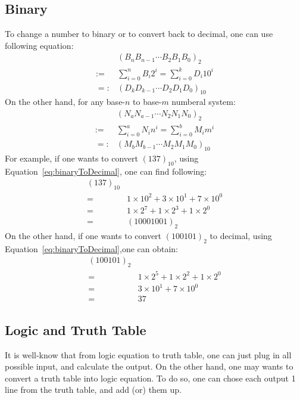 \documentclass[aps,prl,reprint]{revtex4-1}
\begin{document}
	\subsection{Binary}
		To change a number to binary or to convert back to decimal, one can use following equation:
        \begin{align}
            &(B_n B_{n-1} \cdots B_2 B_1 B_0)_2 \\ \nonumber
            :=& \sum_{i = 0}^n B_i 2^i = \sum_{i = 0}^k D_i 10^i \\ \nonumber
            =:& (D_k D_{k-1} \cdots D_2D_1D_0)_{10} \label{eq:binaryToDecimal}
        \end{align}
        On the other hand, for any base-$n$ to base-$m$ numberal system:
        \begin{align}
            &(N_a N_{a-1} \cdots N_2 N_1 N_0)_2 \\ \nonumber
            :=& \sum_{i = 0}^a N_i n^i = \sum_{i = 0}^b M_i m^i \\ \nonumber
            =:& (M_b M_{b-1} \cdots M_2M_1M_0)_{10} \label{eq:arbitraryConvert}
        \end{align}
        For example, if one wants to convert $(137)_{10}$, using Equation~\ref{eq:binaryToDecimal}, one can find following:
        \begin{align*}
            (137)_{10}& \\
            =& 1\times 10^2 + 3\times 10^1 + 7\times 10^0 \\
            =& 1 \times 2^7 + 1 \times 2^3 + 1 \times 2^0\\
            =& (10001001)_{2}
        \end{align*}
        On the other hand, if one wants to convert $(100101)_2$ to decimal, using Equation~\ref{eq:binaryToDecimal},one can obtain:
        \begin{align*}
            (100101)_2&\\
            =& 1 \times 2^5 + 1\times 2^2 + 1\times 2^0\\
            =& 3 \times 10^1 + 7\times 10^0\\
            =& 37
        \end{align*}
    \subsection{Logic and Truth Table}
        It is well-know that from logic equation to truth table, one can just plug in all possible input, and calculate the output. On the other hand, one may wants to convert a truth table into logic equation. To do so, one can chose each output 1 line from the truth table, and add (or) them up.
\end{document}
